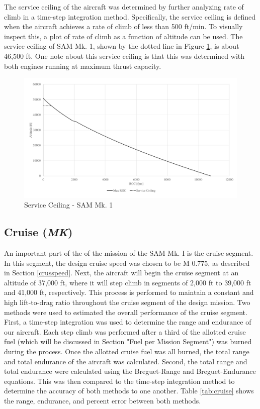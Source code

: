 The service ceiling of the aircraft was determined by further analyzing rate of climb in a time-step integration method. Specifically, the service ceiling is defined when the aircraft achieves a rate of climb of less than 500 ft/min. To visually inspect this, a plot of rate of climb as a function of altitude can be used. The service ceiling of SAM Mk. 1, shown by the dotted line in Figure \ref{serceil}, is about 46,500 ft. One note about this service ceiling is that this was determined with both engines running at maximum thrust capacity.  

\begin{figure}[H]
    \centering
    \includegraphics[width=1.0\textwidth]{Photos/Service_Ceiling.pdf}
    \caption{Service Ceiling -  SAM Mk. 1}
    \label{serceil}
 \end{figure}

\subsection{Cruise (\textit{MK})}
An important part of the of the mission of the SAM Mk. I is the cruise segment. In this segment, the design cruise speed was chosen to be M 0.775, as described in Section \ref{crusspeed}. Next, the aircraft will begin the cruise segment at an altitude of 37,000 ft, where it will step climb in segments of 2,000 ft to 39,000 ft and 41,000 ft, respectively. This process is performed to maintain a constant and high lift-to-drag ratio throughout the cruise segment of the design mission. Two methods were used to estimated the overall performance of the cruise segment. First, a time-step integration was used to determine the range and endurance of our aircraft. Each step climb was performed after a third of the allotted cruise fuel (which will be discussed in Section "Fuel per Mission Segment") was burned during the process. Once the allotted cruise fuel was all burned, the total range and total endurance of the aircraft was calculated. Second, the total range and total endurance were calculated using the Breguet-Range and Breguet-Endurance equations. This was then compared to the time-step integration method to determine the accuracy of both methods to one another. Table \ref{tab:cruise} shows the range, endurance, and percent error between both methods. 

